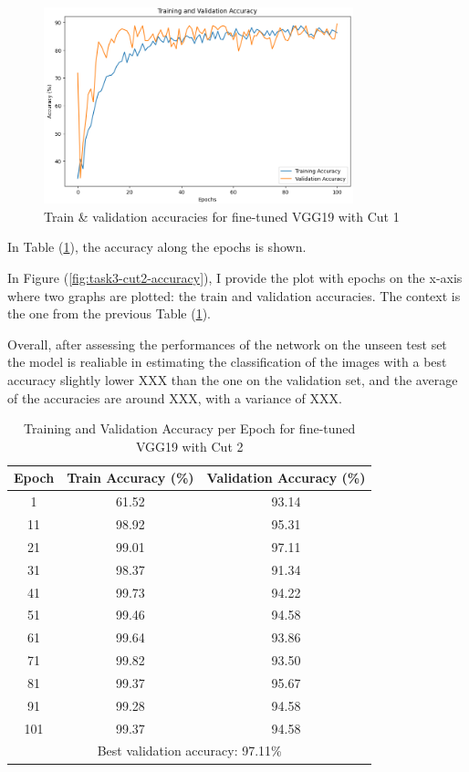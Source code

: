 \documentclass[11pt]{scrartcl}
\begin{document}
\begin{figure}[htbp]
\centering
\includegraphics[width=0.8\textwidth]{./figures/task3-cut1-accuracy.png}
\caption{Train \& validation accuracies for fine-tuned VGG19 with Cut 1}
\label{fig:task3-cut1-accuracy}
\end{figure}


In Table (\ref{tab:task3-cut2-accuracy}),
the accuracy along the epochs is shown.

In Figure (\ref{fig:task3-cut2-accuracy}), 
I provide the plot with epochs on the x-axis where two graphs are plotted:
the train and validation accuracies.
The context is the one from the previous Table (\ref{tab:task3-cut2-accuracy}). 

Overall, after assessing the performances of the network on the unseen test set
the model is realiable in estimating the classification of the images with
a best accuracy slightly lower XXX than the one on the validation set,
and the average of the accuracies are around XXX,
with a variance of XXX.

\begin{table}[htbp]
\centering
\caption{Training and Validation Accuracy per Epoch for fine-tuned VGG19 with Cut 2}
\begin{tabular}{ccc}
\toprule
\textbf{Epoch} & \textbf{Train Accuracy (\%)} & \textbf{Validation Accuracy (\%)} \\
\midrule
1    & 61.52 & 93.14 \\
11   & 98.92 & 95.31 \\
21   & 99.01 & 97.11 \\
31   & 98.37 & 91.34 \\
41   & 99.73 & 94.22 \\
51   & 99.46 & 94.58 \\
61   & 99.64 & 93.86 \\
71   & 99.82 & 93.50 \\
81   & 99.37 & 95.67 \\
91   & 99.28 & 94.58 \\
101  & 99.37 & 94.58 \\
\midrule
\multicolumn{3}{c}{Best validation accuracy: 97.11\%} \\
\bottomrule
\end{tabular}
\label{tab:task3-cut2-accuracy}
\end{table}
\end{document}
